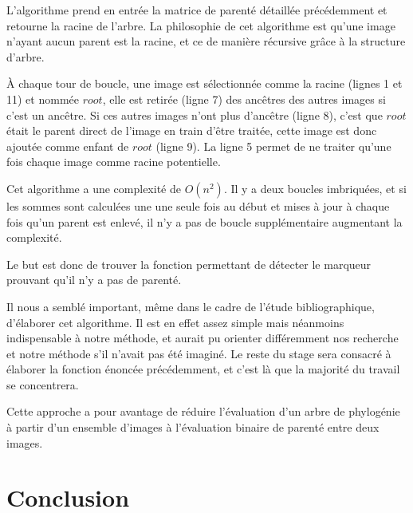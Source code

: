 \documentclass[utf8]{stageM2R} %
\begin{document}
L'algorithme prend en entrée la matrice de parenté détaillée précédemment et retourne la racine de l'arbre. La philosophie de cet algorithme est qu'une image n'ayant aucun parent est la racine, et ce de manière récursive grâce à la structure d'arbre.



À chaque tour de boucle, une image est sélectionnée comme la racine (lignes 1 et 11) et nommée $root$, elle est retirée (ligne 7) des ancêtres des autres images si c'est un ancêtre. Si ces autres images n'ont plus d'ancêtre (ligne 8), c'est que $root$ était le parent direct de l'image en train d'être traitée, cette image est donc ajoutée comme enfant de $root$ (ligne 9). La ligne 5 permet de ne traiter qu'une fois chaque image comme racine potentielle.

Cet algorithme a une complexité de $O(n^{2})$. Il y a deux boucles imbriquées, et si les sommes sont calculées une une seule fois au début et mises à jour à chaque fois qu'un parent est enlevé, il n'y a pas de boucle supplémentaire augmentant la complexité.

Le but est donc de trouver la fonction permettant de détecter le marqueur prouvant qu'il n'y a pas de parenté. 

Il nous a semblé important, même dans le cadre de l'étude bibliographique, d'élaborer cet algorithme. Il est en effet assez simple mais néanmoins indispensable à notre méthode, et aurait pu orienter différemment nos recherche et notre méthode s'il n'avait pas été imaginé. Le reste du stage sera consacré à élaborer la fonction énoncée précédemment, et c'est là que la majorité du travail se concentrera.

Cette approche a pour avantage de réduire l'évaluation d'un arbre de phylogénie à partir d'un ensemble d'images à l'évaluation binaire de parenté entre deux images.

\chapter{Conclusion}
\label{chap4}

\printbibliography
\end{document}
